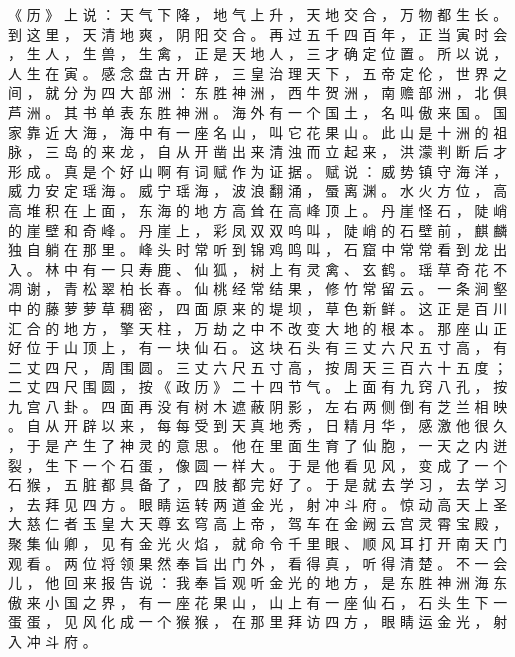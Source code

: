 {《 历 》 上 说 ： 天 气 下 降 ， 地 气 上 升 ， 天 地 交 合 ， 万 物 都 生 长 。
到 这 里 ， 天 清 地 爽 ， 阴 阳 交 合 。
再 过 五 千 四 百 年 ， 正 当 寅 时 会 ， 生 人 ， 生 兽 ， 生 禽 ， 正 是 天 地 人 ， 三 才 确 定 位 置 。
所 以 说 ， 人 生 在 寅 。
感 念 盘 古 开 辟 ， 三 皇 治 理 天 下 ， 五 帝 定 伦 ， 世 界 之 间 ， 就 分 为 四 大 部 洲 ： 东 胜 神 洲 ， 西 牛 贺 洲 ， 南 赡 部 洲 ， 北 俱 芦 洲 。
其 书 单 表 东 胜 神 洲 。
海 外 有 一 个 国 土 ， 名 叫 傲 来 国 。
国 家 靠 近 大 海 ， 海 中 有 一 座 名 山 ， 叫 它 花 果 山 。
此 山 是 十 洲 的 祖 脉 ， 三 岛 的 来 龙 ， 自 从 开 凿 出 来 清 浊 而 立 起 来 ， 洪 濛 判 断 后 才 形 成 。
真 是 个 好 山 啊 有 词 赋 作 为 证 据 。
赋 说 ： 威 势 镇 守 海 洋 ， 威 力 安 定 瑶 海 。
威 宁 瑶 海 ， 波 浪 翻 涌 ， 蜃 离 渊 。
水 火 方 位 ， 高 高 堆 积 在 上 面 ， 东 海 的 地 方 高 耸 在 高 峰 顶 上 。
丹 崖 怪 石 ， 陡 峭 的 崖 壁 和 奇 峰 。
丹 崖 上 ， 彩 凤 双 双 呜 叫 ， 陡 峭 的 石 壁 前 ， 麒 麟 独 自 躺 在 那 里 。
峰 头 时 常 听 到 锦 鸡 鸣 叫 ， 石 窟 中 常 常 看 到 龙 出 入 。
林 中 有 一 只 寿 鹿 、 仙 狐 ， 树 上 有 灵 禽 、 玄 鹤 。
瑶 草 奇 花 不 凋 谢 ， 青 松 翠 柏 长 春 。
仙 桃 经 常 结 果 ， 修 竹 常 留 云 。
一 条 涧 壑 中 的 藤 萝 萝 草 稠 密 ， 四 面 原 来 的 堤 坝 ， 草 色 新 鲜 。
这 正 是 百 川 汇 合 的 地 方 ， 擎 天 柱 ， 万 劫 之 中 不 改 变 大 地 的 根 本 。
那 座 山 正 好 位 于 山 顶 上 ， 有 一 块 仙 石 。
这 块 石 头 有 三 丈 六 尺 五 寸 高 ， 有 二 丈 四 尺 ， 周 围 圆 。
三 丈 六 尺 五 寸 高 ， 按 周 天 三 百 六 十 五 度 ； 二 丈 四 尺 围 圆 ， 按 《 政 历 》 二 十 四 节 气 。
上 面 有 九 窍 八 孔 ， 按 九 宫 八 卦 。
四 面 再 没 有 树 木 遮 蔽 阴 影 ， 左 右 两 侧 倒 有 芝 兰 相 映 。
自 从 开 辟 以 来 ， 每 每 受 到 天 真 地 秀 ， 日 精 月 华 ， 感 激 他 很 久 ， 于 是 产 生 了 神 灵 的 意 思 。
他 在 里 面 生 育 了 仙 胞 ， 一 天 之 内 迸 裂 ， 生 下 一 个 石 蛋 ， 像 圆 一 样 大 。
于 是 他 看 见 风 ， 变 成 了 一 个 石 猴 ， 五 脏 都 具 备 了 ， 四 肢 都 完 好 了 。
于 是 就 去 学 习 ， 去 学 习 ， 去 拜 见 四 方 。
眼 睛 运 转 两 道 金 光 ， 射 冲 斗 府 。
惊 动 高 天 上 圣 大 慈 仁 者 玉 皇 大 天 尊 玄 穹 高 上 帝 ， 驾 车 在 金 阙 云 宫 灵 霄 宝 殿 ， 聚 集 仙 卿 ， 见 有 金 光 火 焰 ， 就 命 令 千 里 眼 、 顺 风 耳 打 开 南 天 门 观 看 。
两 位 将 领 果 然 奉 旨 出 门 外 ， 看 得 真 ， 听 得 清 楚 。
不 一 会 儿 ， 他 回 来 报 告 说 ： 我 奉 旨 观 听 金 光 的 地 方 ， 是 东 胜 神 洲 海 东 傲 来 小 国 之 界 ， 有 一 座 花 果 山 ， 山 上 有 一 座 仙 石 ， 石 头 生 下 一 蛋 蛋 ， 见 风 化 成 一 个 猴 猴 ， 在 那 里 拜 访 四 方 ， 眼 睛 运 金 光 ， 射 入 冲 斗 府 。
}
